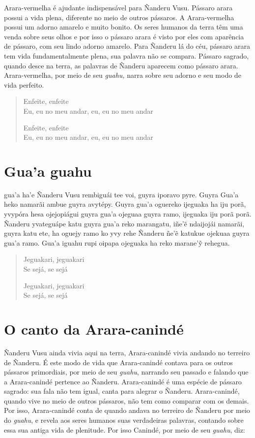  Arara-vermelha é ajudante indispensável para Ñanderu Vusu. Pássaro
arara possui a vida plena, diferente no meio de outros pássaros. A
Arara-vermelha possui um adorno amarelo e muito bonito. Os seres humanos da terra têm uma venda sobre seus olhos e por isso o pássaro arara é visto por eles com aparência de pássaro, com seu lindo adorno amarelo. Para Ñanderu lá do céu, pássaro arara tem vida
fundamentalmente plena, sua palavra não se compara. Pássaro sagrado,
quando desce na terra, as palavras de Ñanderu aparecem como pássaro
arara. Arara-vermelha, por meio de seu \textit{guahu,} narra sobre seu
adorno e seu modo de vida perfeito.

\begin{verse}
Enfeite, enfeite\\
Eu, eu no meu andar, eu, eu no meu andar

Enfeite, enfeite\\
Eu, eu no meu andar, eu, eu no meu andar
\end{verse}

\chapter{Gua'a guahu}

 gua'a ha'e Ñanderu Vusu rembiguái tee voi, guyra iporavo pyre.
Guyra Gua'a heko namarãi ambue guyra avytépy. Guyra gua'a oguereko
ijeguaka ha iju porã, yvypóra hesa ojejopiágui guyra gua'a ojeguaa guyra
ramo, ijeguaka iju porã porã. Ñanderu yvateguápe katu guyra gua'a reko
marangatu, iñe'ẽ ndaijojái namarãi, guyra katu ete, ha oguejy ramo ko
yvy rehe Ñanderu ñe'ẽ katukue ojekuaa guyra gua'a ramo. Gua'a iguahu
rupi oipapa ojeguaka ha reko marane'ỹ rehegua.

\begin{verse}
Jeguakari, jeguakari\\
Se sejá, se sejá

Jeguakari, jeguakari\\
Se sejá, se sejá
\end{verse}

\chapter{O canto da Arara-canindé}

 Ñanderu Vusu ainda vivia aqui na terra, Arara-canindé vivia
andando no terreiro de Ñanderu. É este modo de vida que Arara-canindé
contava para os outros pássaros primordiais, por meio de seu
\textit{guahu}, narrando seu passado e falando que a Arara-canindé
pertence ao Ñanderu. Arara-canindé é uma espécie de pássaro sagrado: sua
fala não tem igual, canta para alegrar o Ñanderu. Arara-canindé, quando
vive no meio de outros pássaros, não tem como comparar com os demais.
Por isso, Arara-canindé conta de quando andava no terreiro de Ñanderu
por meio do \textit{guahu}, e revela aos seres humanos suas verdadeiras
palavras, contando sobre essa sua antiga vida de plenitude. Por isso
Canindé, por meio de seu \textit{guahu}, diz:

